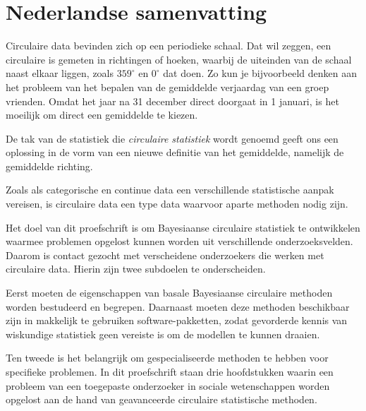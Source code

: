 \documentclass[12pt, a4paper]{book}\usepackage[]{graphicx}\usepackage[]{color}
\begin{document}
\label{circbays}


\backmatter

\chapter{Nederlandse samenvatting}

Circulaire data bevinden zich op een periodieke schaal. Dat wil zeggen, een circulaire is gemeten in richtingen of hoeken, waarbij de uiteinden van de schaal naast elkaar liggen, zoals $359^\circ$ en $0^\circ$ dat doen. Zo kun je bijvoorbeeld denken aan het probleem van het bepalen van de gemiddelde verjaardag van een groep vrienden. Omdat het jaar na 31 december direct doorgaat in 1 januari, is het moeilijk om direct een gemiddelde te kiezen.

De tak van de statistiek die \textit{circulaire statistiek} wordt genoemd geeft ons een oplossing in de vorm van een nieuwe definitie van het gemiddelde, namelijk de gemiddelde richting.

Zoals als categorische en continue data een verschillende statistische aanpak vereisen, is circulaire data een type data waarvoor aparte methoden nodig zijn.


Het doel van dit proefschrift is om Bayesiaanse circulaire statistiek te ontwikkelen waarmee problemen opgelost kunnen worden uit verschillende onderzoeksvelden. Daarom is contact gezocht met verscheidene onderzoekers die werken met circulaire data. Hierin zijn twee subdoelen te onderscheiden.

Eerst moeten de eigenschappen van basale Bayesiaanse circulaire methoden worden bestudeerd en begrepen. Daarnaast moeten deze methoden beschikbaar zijn in makkelijk te gebruiken software-pakketten, zodat gevorderde  kennis van wiskundige statistiek geen vereiste is om de modellen te kunnen draaien.

Ten tweede is het belangrijk om gespecialiseerde methoden te hebben voor specifieke problemen. In dit proefschrift staan drie hoofdstukken waarin een probleem van een toegepaste onderzoeker in sociale wetenschappen worden opgelost aan de hand van geavanceerde circulaire statistische methoden.
\end{document}

